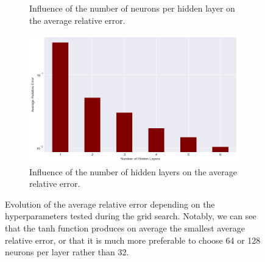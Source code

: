 \begin{figure}
\begin{subfigure}{.5\textwidth}
\caption{Influence of the number of neurons per hidden layer on the average relative error.}
\label{fig:neurons-error-expdisc}
\end{subfigure}%
\begin{subfigure}{.5\textwidth}
\centering
\includegraphics[width=1\linewidth]{imgs/layers-error-expdisc.png}
\caption{Influence of the number of hidden layers on the average relative error.}
\label{fig:layers-error-expdisc}
\end{subfigure}
\caption{Evolution of the average relative error depending on the hyperparameters tested during the grid search. Notably, we can see that the tanh function produces on average the smallest average relative error, or that it is much more preferable to choose 64 or 128 neurons per layer rather than 32.}
\label{fig:hyperparametres-vs-error}
\end{figure}